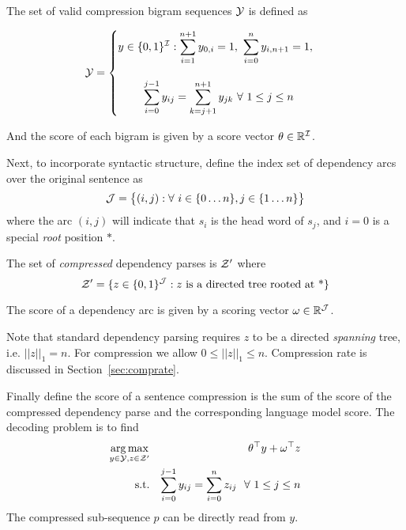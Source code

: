 \documentclass[11pt]{article}
\DeclareMathOperator*{\argmax}{arg\,max}
\newcommand{\Enum}[1]{\{1 \ldots #1\}}
\newcommand{\EnumS}[2]{\{#1 \ldots #2\}}
\newcommand{\Set}[1]{\big\{ #1 \big\}}
\newcommand{\Bin}[1]{\{0,1\}^{#1}}
\newcommand{\Reals}{\mathbb{R}}
\newcommand{\IndexSet}{{\cal I}}
\newcommand{\IndexSetB}{{\cal J}}
\begin{document}
The set of valid compression bigram sequences ${\cal Y}$ is defined as
 
\begin{equation*}
  {\cal Y} = \begin{cases}\displaystyle y \in \Bin{\IndexSet} : 
    \sum_{i=1}^{n+1} y_{0,i} = 1,\ \sum_{i=0}^n y_{i, n+1} = 1, \\\\
    \displaystyle\ \ \ \ \ \ \
    \sum_{i=0}^{j-1} y_{ij} = \sum_{k=j+1}^{n+1} y_{jk}\  \forall\ 1\leq j \leq n  \end{cases}
\end{equation*}

\noindent And the score of each bigram is given by a score vector $\theta \in \Reals^{\IndexSet}$.






Next, to incorporate syntactic structure, define the index set of dependency arcs over the
original sentence as
\[ \IndexSetB = \Set{(i,j) : \forall \  i \in \EnumS{0}{n}, j \in \Enum{n} } \]
\noindent where the arc $(i,j)$ will indicate that $s_i$ is the head word of $s_j$, and $i=0$ is a 
special \textit{root} position $*$.    

The set of \textit{compressed} dependency parses is ${\cal Z}'$ where
\[{\cal Z }' = \{z \in \Bin{\IndexSetB}: z \hbox{ is a directed tree rooted at *} \}  \]

\noindent 
The score of a dependency arc is given by a scoring vector $\omega \in
\Reals^{\IndexSetB}$.


Note that standard dependency parsing requires $z$ to be a directed
\textit{spanning} tree, i.e. $||z||_1 = n$. For compression
we allow $0 \leq ||z||_1 \leq n$. Compression rate is discussed in 
Section~\ref{sec:comprate}.   



Finally define the score of a sentence compression is the
sum of the score of the compressed dependency parse and the
corresponding language model score. The decoding problem is to find
\begin{eqnarray*}
 \argmax_{y \in {\cal Y}, z\in {\cal Z}'} &&\theta^\top y +  \omega^\top z \\
\mathrm{s.t.} &&  \sum_{i = 0}^{j-1} y_{i j} =  \sum_{i=0}^n z_{i j} \ \ \forall\  1 \leq j \leq n 
\end{eqnarray*}
\noindent The compressed sub-sequence $p$ can be directly read from $y$. 
\end{document}
